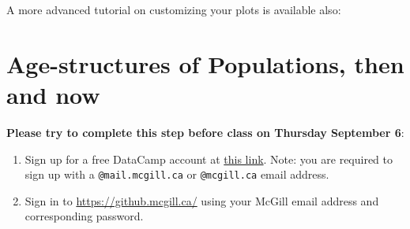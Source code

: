 \documentclass[letterpaper,9pt,twocolumn,twoside,printwatermark=false]{pinp}
\providecommand{\tightlist}{%
  \setlength{\itemsep}{0pt}\setlength{\parskip}{0pt}}
\begin{document}
\begin{Shaded}
\begin{Highlighting}[]
\OperatorTok{::}\NormalTok{(}\NormalTok{, }
                      \NormalTok{)}
\end{Highlighting}
\end{Shaded}

A more advanced tutorial on customizing your plots is available also:

\begin{Shaded}
\begin{Highlighting}[]
\OperatorTok{::}\NormalTok{(}\NormalTok{, }
                      \NormalTok{)}
\end{Highlighting}
\end{Shaded}

\section{Age-structures of Populations, then and
now}\label{age-structures-of-populations-then-and-now}

\textbf{Please try to complete this step before class on Thursday
September 6}:

\begin{enumerate}
\def\labelenumi{\arabic{enumi}.}
\tightlist
\item
  Sign up for a free DataCamp account at
  \href{https://www.datacamp.com/groups/shared_links/4c7d78a632b557dfdd6618b3e8fac09495571fec}{this
  link}. Note: you are required to sign up with a
  \texttt{@mail.mcgill.ca} or \texttt{@mcgill.ca} email address.\\
\item
  Sign in to \url{https://github.mcgill.ca/} using your McGill email
  address and corresponding password.
\end{enumerate}
\end{document}
